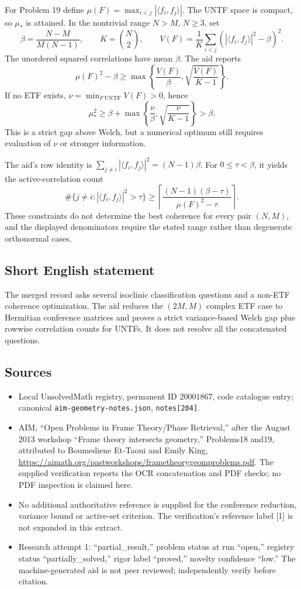 \documentclass[11pt]{article}
\begin{document}
For Problem 19 define \(\mu(F)=\max_{i<j}|\langle f_i,f_j\rangle|\). The UNTF space is compact, so \(\mu_*\) is attained. In the nontrivial range \(N>M\), \(N\geq3\), set
\[
 \beta=\frac{N-M}{M(N-1)},\qquad K=\binom N2,\qquad
 V(F)=\frac1K\sum_{i<j}(|\langle f_i,f_j\rangle|^2-\beta)^2.
\]
The unordered squared correlations have mean \(\beta\). The aid reports
\[
 \mu(F)^2-\beta\geq
 \max\left\{\frac{V(F)}\beta,
 \sqrt{\frac{V(F)}{K-1}}\right\}.
\]
If no ETF exists, \(\nu=\min_{F\ \mathrm{UNTF}}V(F)>0\), hence
\[
 \mu_*^2\geq\beta+
 \max\left\{\frac\nu\beta,\sqrt{\frac\nu{K-1}}\right\}>\beta.
\]
This is a strict gap above Welch, but a numerical optimum still requires evaluation of \(\nu\) or stronger information.

The aid's row identity is \(\sum_{j\ne i}|\langle f_i,f_j\rangle|^2=(N-1)\beta\). For \(0\leq\tau<\beta\), it yields the active-correlation count
\[
 \#\{j\ne i:|\langle f_i,f_j\rangle|^2>\tau\}
 \geq\left\lceil\frac{(N-1)(\beta-\tau)}{\mu(F)^2-\tau}\right\rceil.
\]
These constraints do not determine the best coherence for every pair \((N,M)\), and the displayed denominators require the stated range rather than degenerate orthonormal cases.
\subsection{Short English statement}
The merged record asks several isoclinic classification questions and a non-ETF coherence optimization. The aid reduces the \((2M,M)\) complex ETF case to Hermitian conference matrices and proves a strict variance-based Welch gap plus rowwise correlation counts for UNTFs. It does not resolve all the concatenated questions.
\subsection{Sources}
\begin{itemize}
\item Local UnsolvedMath registry, permanent ID \(20001867\), code catalogue entry; canonical \texttt{aim-geometry-notes.json}, \texttt{notes[204]}.
\item AIM, ``Open Problems in Frame Theory/Phase Retrieval,'' after the August 2013 workshop ``Frame theory intersects geometry,'' Problems18 and19, attributed to Boumediene Et-Taoui and Emily King, \url{https://aimath.org/pastworkshops/frametheorygeomproblems.pdf}. The supplied verification reports the OCR concatenation and PDF checks; no PDF inspection is claimed here.
\item No additional authoritative reference is supplied for the conference reduction, variance bound or active-set criterion. The verification's reference label [1] is not expanded in this extract.
\item Research attempt 1: ``partial\_result,'' problem status at run ``open,'' registry status ``partially\_solved,'' rigor label ``proved,'' novelty confidence ``low.'' The machine-generated aid is not peer reviewed; independently verify before citation.
\end{itemize}
\end{document}
